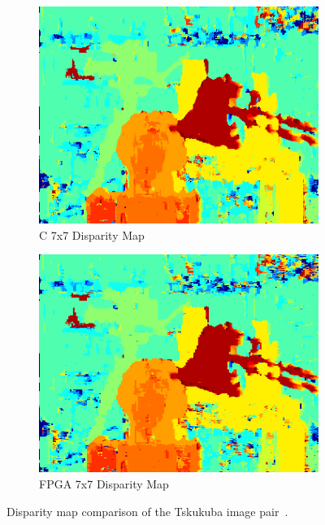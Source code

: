 \begin{figure}
\begin{center}
\begin{subfigure}{0.45\textwidth}
		\includegraphics[width=\textwidth]{figures/tsukuba_c_7x7.png}
		\caption{C 7x7 Disparity Map}
		\label{fig:tsukubaC7x7}
	\end{subfigure}
	\begin{subfigure}{0.45\textwidth}
		\includegraphics[width=\textwidth]{figures/tsukuba_buffer_7x7_2.png}
		\caption{FPGA 7x7 Disparity Map}
		\label{fig:tsukubaFPGA7x7}
	\end{subfigure}
	\captionfonts
	\caption{Disparity map comparison of the Tskukuba image pair~\cite{middlebury}.}
	\label{fig:tsukubaDispMap}
\end{center}
\end{figure}

